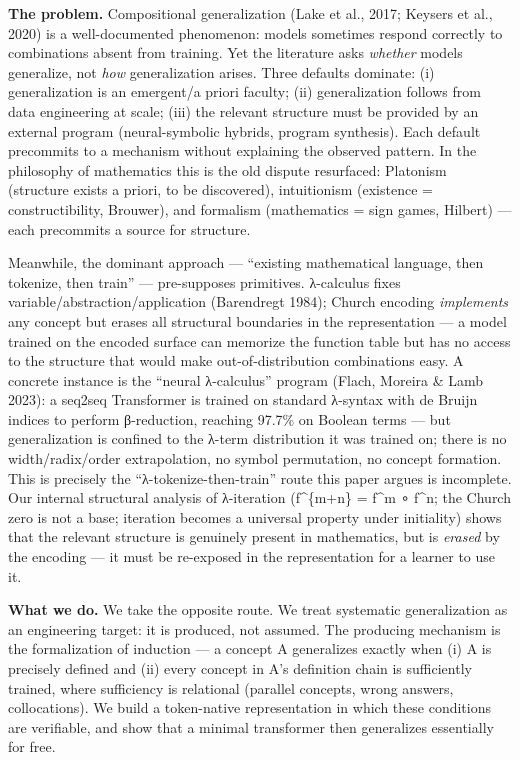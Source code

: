 \documentclass[
]{article}
\begin{document}
\textbf{The problem.} Compositional generalization (Lake et al., 2017;
Keysers et al., 2020) is a well-documented phenomenon: models sometimes
respond correctly to combinations absent from training. Yet the
literature asks \emph{whether} models generalize, not \emph{how}
generalization arises. Three defaults dominate: (i) generalization is an
emergent/a priori faculty; (ii) generalization follows from data
engineering at scale; (iii) the relevant structure must be provided by
an external program (neural-symbolic hybrids, program synthesis). Each
default precommits to a mechanism without explaining the observed
pattern. In the philosophy of mathematics this is the old dispute
resurfaced: Platonism (structure exists a priori, to be discovered),
intuitionism (existence = constructibility, Brouwer), and formalism
(mathematics = sign games, Hilbert) --- each precommits a source for
structure.

Meanwhile, the dominant approach --- ``existing mathematical language,
then tokenize, then train'' --- pre-supposes primitives. λ-calculus
fixes variable/abstraction/application (Barendregt 1984); Church
encoding \emph{implements} any concept but erases all structural
boundaries in the representation --- a model trained on the encoded
surface can memorize the function table but has no access to the
structure that would make out-of-distribution combinations easy. A
concrete instance is the ``neural λ-calculus'' program (Flach, Moreira
\& Lamb 2023): a seq2seq Transformer is trained on standard λ-syntax
with de Bruijn indices to perform β-reduction, reaching 97.7\% on
Boolean terms --- but generalization is confined to the λ-term
distribution it was trained on; there is no width/radix/order
extrapolation, no symbol permutation, no concept formation. This is
precisely the ``λ-tokenize-then-train'' route this paper argues is
incomplete. Our internal structural analysis of λ-iteration
(f\^{}\{m+n\} = f\^{}m ∘ f\^{}n; the Church zero is not a base;
iteration becomes a universal property under initiality) shows that the
relevant structure is genuinely present in mathematics, but is
\emph{erased} by the encoding --- it must be re-exposed in the
representation for a learner to use it.

\textbf{What we do.} We take the opposite route. We treat systematic
generalization as an engineering target: it is produced, not assumed.
The producing mechanism is the formalization of induction --- a concept
A generalizes exactly when (i) A is precisely defined and (ii) every
concept in A's definition chain is sufficiently trained, where
sufficiency is relational (parallel concepts, wrong answers,
collocations). We build a token-native representation in which these
conditions are verifiable, and show that a minimal transformer then
generalizes essentially for free.
\end{document}
